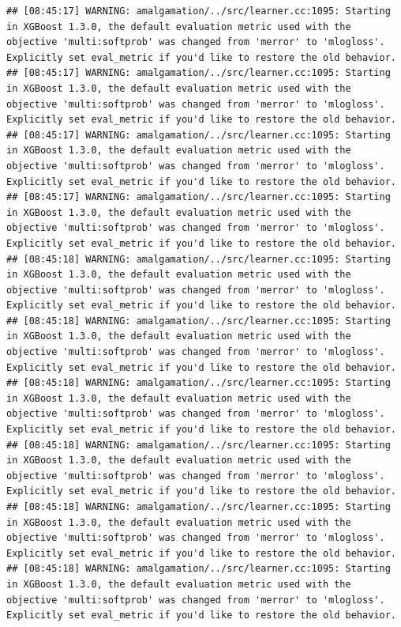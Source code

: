 \documentclass[
]{scrbook}
\begin{document}
\begin{verbatim}
## [08:45:17] WARNING: amalgamation/../src/learner.cc:1095: Starting in XGBoost 1.3.0, the default evaluation metric used with the objective 'multi:softprob' was changed from 'merror' to 'mlogloss'. Explicitly set eval_metric if you'd like to restore the old behavior.
## [08:45:17] WARNING: amalgamation/../src/learner.cc:1095: Starting in XGBoost 1.3.0, the default evaluation metric used with the objective 'multi:softprob' was changed from 'merror' to 'mlogloss'. Explicitly set eval_metric if you'd like to restore the old behavior.
## [08:45:17] WARNING: amalgamation/../src/learner.cc:1095: Starting in XGBoost 1.3.0, the default evaluation metric used with the objective 'multi:softprob' was changed from 'merror' to 'mlogloss'. Explicitly set eval_metric if you'd like to restore the old behavior.
## [08:45:17] WARNING: amalgamation/../src/learner.cc:1095: Starting in XGBoost 1.3.0, the default evaluation metric used with the objective 'multi:softprob' was changed from 'merror' to 'mlogloss'. Explicitly set eval_metric if you'd like to restore the old behavior.
## [08:45:18] WARNING: amalgamation/../src/learner.cc:1095: Starting in XGBoost 1.3.0, the default evaluation metric used with the objective 'multi:softprob' was changed from 'merror' to 'mlogloss'. Explicitly set eval_metric if you'd like to restore the old behavior.
## [08:45:18] WARNING: amalgamation/../src/learner.cc:1095: Starting in XGBoost 1.3.0, the default evaluation metric used with the objective 'multi:softprob' was changed from 'merror' to 'mlogloss'. Explicitly set eval_metric if you'd like to restore the old behavior.
## [08:45:18] WARNING: amalgamation/../src/learner.cc:1095: Starting in XGBoost 1.3.0, the default evaluation metric used with the objective 'multi:softprob' was changed from 'merror' to 'mlogloss'. Explicitly set eval_metric if you'd like to restore the old behavior.
## [08:45:18] WARNING: amalgamation/../src/learner.cc:1095: Starting in XGBoost 1.3.0, the default evaluation metric used with the objective 'multi:softprob' was changed from 'merror' to 'mlogloss'. Explicitly set eval_metric if you'd like to restore the old behavior.
## [08:45:18] WARNING: amalgamation/../src/learner.cc:1095: Starting in XGBoost 1.3.0, the default evaluation metric used with the objective 'multi:softprob' was changed from 'merror' to 'mlogloss'. Explicitly set eval_metric if you'd like to restore the old behavior.
## [08:45:18] WARNING: amalgamation/../src/learner.cc:1095: Starting in XGBoost 1.3.0, the default evaluation metric used with the objective 'multi:softprob' was changed from 'merror' to 'mlogloss'. Explicitly set eval_metric if you'd like to restore the old behavior.

\end{verbatim}
\end{document}
